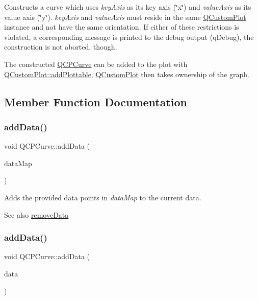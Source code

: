 Constructs a curve which uses {\itshape key\+Axis} as its key axis (\char`\"{}x\char`\"{}) and {\itshape value\+Axis} as its value axis (\char`\"{}y\char`\"{}). {\itshape key\+Axis} and {\itshape value\+Axis} must reside in the same \mbox{\hyperlink{class_q_custom_plot}{Q\+Custom\+Plot}} instance and not have the same orientation. If either of these restrictions is violated, a corresponding message is printed to the debug output (q\+Debug), the construction is not aborted, though.

The constructed \mbox{\hyperlink{class_q_c_p_curve}{Q\+C\+P\+Curve}} can be added to the plot with \mbox{\hyperlink{class_q_custom_plot_ab7ad9174f701f9c6f64e378df77927a6}{Q\+Custom\+Plot\+::add\+Plottable}}, \mbox{\hyperlink{class_q_custom_plot}{Q\+Custom\+Plot}} then takes ownership of the graph. 

\subsection{Member Function Documentation}
\mbox{\label{class_q_c_p_curve_a4e24023c3b9ac75440c7a260172c99af}} 
\subsubsection{\texorpdfstring{add\+Data()}{addData()}\hspace{0.1cm}{\footnotesize\ttfamily [1/5]}}
{\footnotesize\ttfamily void Q\+C\+P\+Curve\+::add\+Data (\begin{DoxyParamCaption}\item[{const \mbox{\hyperlink{qcustomplot_8h_a444d37ec9cb2951b3a7fe443c34d1658}{Q\+C\+P\+Curve\+Data\+Map}} \&}]{data\+Map }\end{DoxyParamCaption})}

Adds the provided data points in {\itshape data\+Map} to the current data. \begin{DoxySeeAlso}{See also}
\mbox{\hyperlink{class_q_c_p_curve_ad45bb5479be799163028ef2b776f7221}{remove\+Data}} 
\end{DoxySeeAlso}
\mbox{\label{class_q_c_p_curve_ad304326aba096911f92452d8bfe0470e}} 
\subsubsection{\texorpdfstring{add\+Data()}{addData()}\hspace{0.1cm}{\footnotesize\ttfamily [2/5]}}
{\footnotesize\ttfamily void Q\+C\+P\+Curve\+::add\+Data (\begin{DoxyParamCaption}\item[{const \mbox{\hyperlink{class_q_c_p_curve_data}{Q\+C\+P\+Curve\+Data}} \&}]{data }\end{DoxyParamCaption})}

